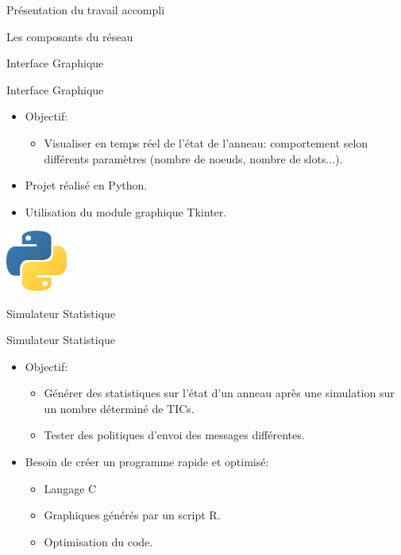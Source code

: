 \documentclass[10 pt]{beamer}
\begin{document}
\begin{section}{Pr\'esentation du travail accompli}
\begin{subsection}{Les composants du r\'eseau}
\end{subsection}


\begin{subsection}{Interface Graphique}
\begin{frame}{Interface Graphique}
 \begin{itemize}
 \item Objectif:
 \begin{itemize}
 \item Visualiser en temps r\'eel de l'\'etat de l'anneau: comportement selon diff\'erents param\`etres (nombre de noeuds, nombre de slots...).
  \end{itemize}
  \vspace{0,5cm}
\item Projet r\'ealis\'e en Python.
\vspace{0,7cm}
\item Utilisation du module graphique Tkinter.
  \end{itemize}
    \hspace{9cm} \includegraphics [width=20mm]{logos/logop.png}
\end{frame}


\end{subsection}


\begin{subsection}{Simulateur Statistique}
\begin{frame}{Simulateur Statistique}
 \begin{itemize}
 \item Objectif:
 \begin{itemize}
 \item G\'en\'erer des statistiques sur l'\'etat d'un anneau apr\`es une simulation sur un nombre d\'etermin\'e de TICs.
 \item Tester des politiques d'envoi des messages diff\'erentes.
  \end{itemize}
  \vspace{0,5cm}
\item Besoin de cr\'eer un programme rapide et optimis\'e:
 \begin{itemize}
 \item Langage C
 \item Graphiques g\'en\'er\'es par un script R.
 \item Optimisation du code.
   \end{itemize}
 \end{itemize}
 

\end{frame}
\end{subsection}
\end{section}
\end{document}
